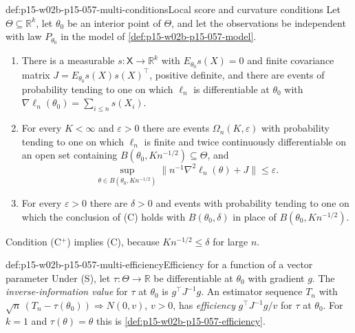 \begin{hbdefinition}{def:p15-w02b-p15-057-multi-conditions}{Local score and curvature conditions}
Let \(\Theta\subseteq\mathbb R^k\), let \(\theta_0\) be an interior point
of \(\Theta\), and let the observations be independent with law
\(P_{\theta_0}\) in the model of \cref{def:p15-w02b-p15-057-model}.
\begin{enumerate}
\item[(S)] There is a measurable \(s:\mathsf X\to\mathbb R^k\) with
 \(E_{\theta_0}s(X)=0\) and finite covariance matrix
 \(J=E_{\theta_0}s(X)s(X)^{\top}\), positive definite, and there are
 events of probability tending to one on which \(\ell_n\) is differentiable
 at \(\theta_0\) with \(\nabla\ell_n(\theta_0)=\sum_{i\leq n}s(X_i)\).
\item[(C)] For every \(K<\infty\) and \(\varepsilon>0\) there are events
 \(\Omega_n(K,\varepsilon)\) with probability tending to one on which
 \(\ell_n\) is finite and twice continuously differentiable on an open set
 containing \(B(\theta_0,Kn^{-1/2})\subseteq\Theta\), and
 \[
  \sup_{\theta\in B(\theta_0,Kn^{-1/2})}
  \bigl\|n^{-1}\nabla^2\ell_n(\theta)+J\bigr\|\leq\varepsilon .
 \]
\item[(C\(^{+}\))] For every \(\varepsilon>0\) there are \(\delta>0\) and
 events with probability tending to one on which the conclusion of (C)
 holds with \(B(\theta_0,\delta)\) in place of \(B(\theta_0,Kn^{-1/2})\).
\end{enumerate}
Condition (C\(^{+}\)) implies (C), because \(Kn^{-1/2}\leq\delta\) for
large \(n\).
\end{hbdefinition}

\begin{hbdefinition}{def:p15-w02b-p15-057-multi-efficiency}{Efficiency for a function of a vector parameter}
Under (S), let \(\tau:\Theta\to\mathbb R\) be differentiable at
\(\theta_0\) with gradient \(g\). The \emph{inverse-information value}
for \(\tau\) at \(\theta_0\) is \(g^{\top}J^{-1}g\). An estimator sequence
\(T_n\) with \(\sqrt n\,(T_n-\tau(\theta_0))\Rightarrow N(0,v)\), \(v>0\),
has \emph{efficiency} \(g^{\top}J^{-1}g/v\) for \(\tau\) at \(\theta_0\).
For \(k=1\) and \(\tau(\theta)=\theta\) this is
\cref{def:p15-w02b-p15-057-efficiency}.
\end{hbdefinition}

